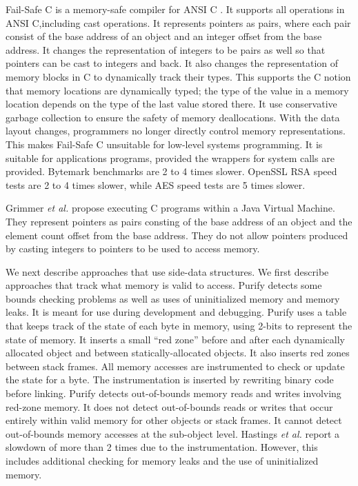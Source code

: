 Fail-Safe C is a memory-safe compiler for ANSI C \cite{Oiwa2009}.  It
supports all operations in ANSI C,including cast operations.
It represents pointers as pairs, where each pair consist of the base address
of an object and an integer offset from the base address. 
It changes the representation of integers to be pairs as well so that pointers can 
be cast to integers and back.  It also changes the representation of memory blocks in
C to dynamically track their types.  This
supports the C notion that memory locations are dynamically typed; the type
of the value in a memory location depends on the type of the last value stored there.
It use conservative garbage collection to ensure the safety of memory
deallocations.   With the data layout changes, programmers no longer 
directly control memory representations.  This makes Fail-Safe C unsuitable for low-level  systems programming.
It is suitable for applications programs, provided the wrappers for system
calls are provided.  Bytemark benchmarks are 2 to 4 times slower.  OpenSSL RSA
speed tests are 2 to 4 times slower, while AES speed tests are 5 times slower.

Grimmer {\it et al.} \cite{Grimmer2015} propose executing C programs within a Java
Virtual Machine.   They represent pointers as pairs consting of the base address of an
object and the element count offset from the base address.  They do not allow
pointers produced by casting integers to pointers to be used to access
memory.

We next describe approaches that use side-data structures.    We first
describe approaches that track what memory is valid to access.
Purify \cite{Hastings1992, Unicom2016} detects some bounds checking problems
as well as uses of uninitialized memory and memory leaks.  It is meant for
use during development and debugging.  Purify uses a table that keeps track
of the state of each byte in memory, using 2-bits to represent the state of
memory.  It inserts a small ``red zone'' before and after each dynamically
allocated object and between statically-allocated objects.   It also
inserts red zones between stack frames.  All memory accesses are instrumented 
to  check or update the state for a byte. 
The instrumentation is inserted by rewriting binary code before linking.
Purify detects out-of-bounds memory reads and writes involving red-zone
memory.   It does not detect out-of-bounds
reads or writes that occur entirely within valid memory for other objects
or stack frames. It cannot detect out-of-bounds memory accesses at
the sub-object level.
Hastings {\it et al.} report a slowdown of more than 2 times due to
the instrumentation.  However, this includes additional checking for memory leaks 
and the use of uninitialized memory.

